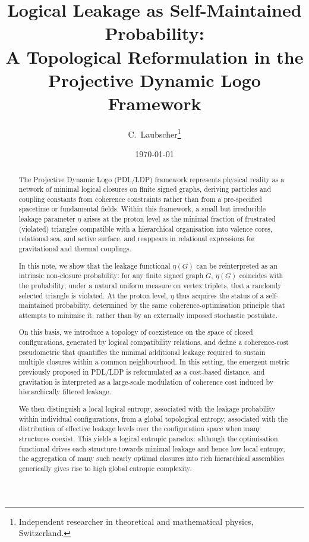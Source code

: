 \documentclass[11pt,a4paper]{article}
\theoremstyle{definition}
\newcommand{\etaL}{\eta} %
\begin{document}
\title{Logical Leakage as Self-Maintained Probability:\\
A Topological Reformulation in the Projective Dynamic Logo Framework}

\author{C.~Laubscher\thanks{Independent researcher in theoretical and mathematical physics, Switzerland.}\\[4pt]}
\date{\small \today}

\maketitle

\begin{abstract}
The Projective Dynamic Logo (PDL/LDP) framework represents physical reality as a network of minimal logical closures on finite signed graphs, deriving particles and coupling constants from coherence constraints rather than from a pre-specified spacetime or fundamental fields. Within this framework, a small but irreducible leakage parameter \(\etaL\) arises at the proton level as the minimal fraction of frustrated (violated) triangles compatible with a hierarchical organisation into valence cores, relational sea, and active surface, and reappears in relational expressions for gravitational and thermal couplings. 

In this note, we show that the leakage functional \(\eta(G)\) can be reinterpreted as an intrinsic non-closure probability: for any finite signed graph \(G\), \(\eta(G)\) coincides with the probability, under a natural uniform measure on vertex triplets, that a randomly selected triangle is violated. At the proton level, \(\etaL\) thus acquires the status of a self-maintained probability, determined by the same coherence-optimisation principle that attempts to minimise it, rather than by an externally imposed stochastic postulate. 

On this basis, we introduce a topology of coexistence on the space of closed configurations, generated by logical compatibility relations, and define a coherence-cost pseudometric that quantifies the minimal additional leakage required to sustain multiple closures within a common neighbourhood. In this setting, the emergent metric previously proposed in PDL/LDP is reformulated as a cost-based distance, and gravitation is interpreted as a large-scale modulation of coherence cost induced by hierarchically filtered leakage. 

We then distinguish a local logical entropy, associated with the leakage probability within individual configurations, from a global topological entropy, associated with the distribution of effective leakage levels over the configuration space when many structures coexist. This yields a logical entropic paradox: although the optimisation functional drives each structure towards minimal leakage and hence low local entropy, the aggregation of many such nearly optimal closures into rich hierarchical assemblies generically gives rise to high global entropic complexity. 


\end{abstract}
\end{document}

